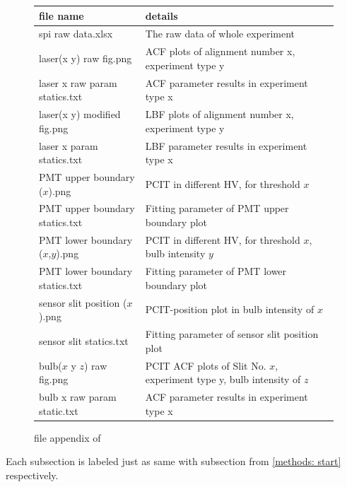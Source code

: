 \documentclass{article}
\begin{document}
\begin{figure}[H]
    \begin{tabular}{  m{5.2cm} | m{8.7cm} } 

      file name& details \\ 
      \hline
      \hline
        spi raw data.xlsx & The raw data of whole experiment\\
      \hline
        laser(x y) raw fig.png & ACF plots of alignment number x, experiment type y\\
      \hline
        laser x raw param statics.txt & ACF parameter results in experiment type x\\
      \hline
        laser(x y) modified fig.png & LBF plots of alignment number x, experiment type y\\
      \hline
        laser x param statics.txt & LBF parameter results in experiment type x\\
      \hline
        PMT upper boundary ($x$).png & PCIT in different HV, for threshold $x$\\
      \hline
        PMT upper boundary statics.txt & Fitting parameter of PMT upper boundary plot\\
      \hline
        PMT lower boundary ($x$,$y$).png & PCIT in different HV, for threshold $x$, bulb intensity $y$\\
      \hline
        PMT lower boundary statics.txt & Fitting parameter of PMT lower boundary plot\\
      \hline
        sensor slit position ($x$).png & PCIT-position plot in bulb intensity of $x$\\
      \hline
        sensor slit statics.txt & Fitting parameter of sensor slit position plot\\
      \hline
        bulb($x$ y $z$) raw fig.png & PCIT ACF plots of Slit No. $x$, experiment type y, bulb intensity of $z$\\
      \hline
        bulb x raw param static.txt & ACF parameter results in experiment type x \\

    \end{tabular}
    \caption{file appendix of \cite{github}}
    \label{fig: file_appendix}
\end{figure}

Each subsection is labeled just as same with subsection from \ref{methods: start} respectively.
\end{document}
